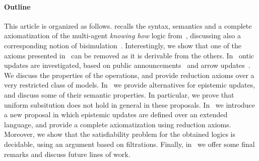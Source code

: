 \paragraph{\bf Outline} This article is organized as follows.  recalls the syntax, semantics and a complete axiomatization of the multi-agent \emph{knowing how} logic from~\cite{AFSVQ21}, discussing also a corresponding notion of bisimulation~\cite{AFSVQ23report}. Interestingly, we show that one of the axioms presented in~\cite{AFSVQ21,AFSVQ23report} can be removed as it is derivable from the others. In~ ontic updates are investigated, based on public announcements~\cite{Plaza89:lopc} and arrow updates~\cite{KooiR11}. We discuss the properties of the operations, and provide reduction axioms over a very restricted class of models. In~ we provide alternatives for epistemic updates, and discuss some of their semantic properties. In particular, we prove that uniform subsitution does not hold in general in these proposals. In~ we introduce a new proposal in which epistemic updates are defined over an extended language, and provide a complete axiomatization using reduction axioms. Moreover, we show that the satisfiability problem for the obtained logics is decidable, using an argument based on filtrations.  Finally, in~ we offer some final remarks and discuss future lines of work.
